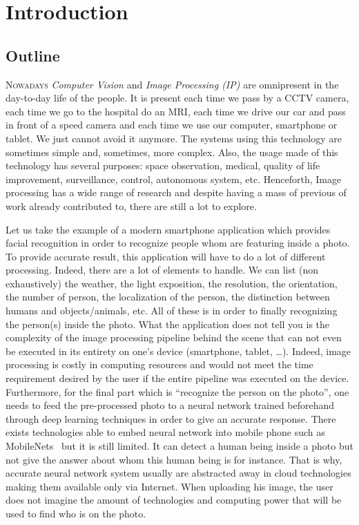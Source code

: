 \chapter{Introduction}
\label{chap:introduction}

\section*{Outline}

\lettrine[lines=2]{N}{owadays} \emph{Computer Vision} and \emph{Image Processing (IP)} are omnipresent in the day-to-day
life of the people. It is present each time we pass by a CCTV camera, each time we go to the hospital do an MRI, each
time we drive our car and pass in front of a speed camera and each time we use our computer, smartphone or tablet. We
just cannot avoid it anymore. The systems using this technology are sometimes simple and, sometimes, more complex. Also,
the usage made of this technology has several purposes: space observation, medical, quality of life improvement,
surveillance, control, autonomous system, etc. Henceforth, Image processing has a wide range of research and despite
having a mass of previous of work already contributed to, there are still a lot to explore.

Let us take the example of a modern smartphone application which provides facial recognition in order to recognize
people whom are featuring inside a photo. To provide accurate result, this application will have to do a lot of
different processing. Indeed, there are a lot of elements to handle. We can list (non exhaustively) the weather, the
light exposition, the resolution, the orientation, the number of person, the localization of the person, the distinction
between humans and objects/animals, etc. All of these is in order to finally recognizing the person(s) inside the photo.
What the application does not tell you is the complexity of the image processing pipeline behind the scene that can not
even be executed in its entirety on one's device (smartphone, tablet, \ldots). Indeed, image processing is costly in
computing resources and would not meet the time requirement desired by the user if the entire pipeline was executed on
the device. Furthermore, for the final part which is ``recognize the person on the photo'', one needs to feed the
pre-processed photo to a neural network trained beforehand through deep learning techniques in order to give an accurate
response. There exists technologies able to embed neural network into mobile phone such as
MobileNets~\parencite{howard.2017.mobilenets} but it is still limited. It can detect a human being inside a photo but
not give the answer about whom this human being is for instance. That is why, accurate neural network system usually are
abstracted away in cloud technologies making them available only via Internet. When uploading his image, the user does
not imagine the amount of technologies and computing power that will be used to find who is on the photo.

